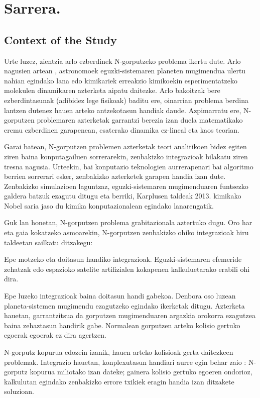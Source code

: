 \chapter{Sarrera.}


\section{Context of the Study}

Urte luzez, zientzia arlo ezberdinek N-gorputzeko problema ikertu dute. Arlo nagusien artean , astronomoek eguzki-sistemaren planeten mugimendua ulertu nahian egindako lana edo kimikariek erreakzio kimikoekin esperimentatzeko molekulen dinamikaren azterketa aipatu daitezke. Arlo bakoitzak bere ezberdintasunak (adibidez lege fisikoak) baditu ere, oinarrian problema berdina lantzen dutenez hauen arteko antzekotasun handiak daude. Azpimarratu ere,  N-gorputzen problemaren azterketak garrantzi berezia izan duela matematikako eremu ezberdinen garapenean, esaterako dinamika ez-lineal eta kaos teorian. 

Garai batean, N-gorputzen problemen azterketak teori analitikoen bidez egiten ziren baina konputagailuen sorrerarekin, zenbakizko integrazioak bilakatu ziren tresna nagusia. Urteekin, bai konputazio teknologien aurrerapenari bai algoritmo berrien sorrerari esker, zenbakizko azterketek garapen handia izan dute. Zenbakizko simulazioen laguntzaz, eguzki-sistemaren mugimenduaren funtsezko galdera batzuk ezagutu ditugu eta berriki, Karplusen taldeak 2013. kimikako Nobel saria \cite{Karplus2014} jaso du kimika konputazionalean egindako lanarengatik.       

Guk lan honetan, N-gorputzen problema grabitazionala aztertuko dugu. Oro har eta gaia kokatzeko asmoarekin, N-gorputzen zenbakizko ohiko integrazioak hiru taldeetan sailkatu ditzakegu:
\begin{enumerate}
{
\item Epe motzeko eta doitasun handiko integrazioak. 
 Eguzki-sistemaren efemeride zehatzak edo espazioko satelite artifizialen kokapenen kalkuluetarako erabili ohi dira.
\item Epe luzeko integrazioak baina doitasun handi gabekoa.
 Denbora oso luzean planeta-sistemen mugimendu ezagutzeko egindako ikerketak ditugu. Azterketa hauetan, garrantzitsua da gorputzen mugimenduaren  argazkia orokorra ezagutzea baina zehaztasun handirik gabe. Normalean gorputzen arteko kolisio gertuko egoerak egoerak ez dira agertzen.     
\item N-gorputz kopurua edozein izanik, hauen arteko kolisioak gerta daitezkeen problemak.
 Integrazio hauetan, konplexutasun handiari aurre egin behar zaio : N-gorputz kopurua miliotako izan dateke; gainera kolisio gertuko egoeren ondorioz, kalkulutan egindako zenbakizko errore txikiek eragin handia izan ditzakete soluzioan.
    
}
\end{enumerate}

